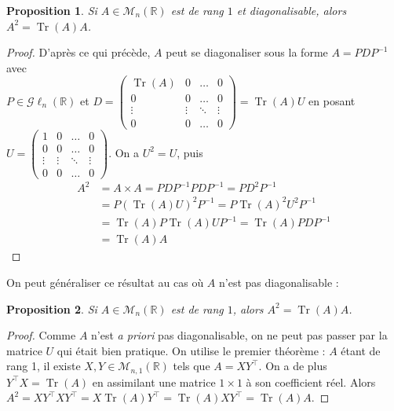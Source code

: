 \documentclass[a4paper]{article}
\newtheorem*{proposition}{Proposition}
\begin{document}
\begin{proposition}
    Si $A \in \mathcal{M}_{n}(\mathbb{R})$ est de rang $1$ et diagonalisable, alors $A^2 = \operatorname{Tr}(A)A$.
\end{proposition}

\begin{proof}
    D'après ce qui précède, $A$ peut se diagonaliser sous la forme $A = PDP^{-1}$ avec\\ $P \in \mathcal{G}\ell_n(\mathbb{R})$ et $D = \begin{pmatrix} \operatorname{Tr}(A) & 0 & \dots & 0 \\ 0 & 0 & \dots & 0 \\ \vdots & \vdots & \ddots & \vdots \\ 0 & 0 & \dots & 0\end{pmatrix} = \operatorname{Tr}(A) U$ en posant $U = \begin{pmatrix} 1 & 0 & \dots & 0 \\ 0 & 0 & \dots & 0 \\ \vdots & \vdots & \ddots & \vdots \\ 0 & 0 & \dots & 0\end{pmatrix}$. On a $U^2 = U$, puis 
    \begin{align*}
        A^2 &= A \times A = PDP^{-1}PDP^{-1} = PD^2P^{-1} \\
        &= P\left(\operatorname{Tr}(A)U\right)^2P^{-1} = P\operatorname{Tr}(A)^2U^2P^{-1} \\
        &= \operatorname{Tr}(A)P\operatorname{Tr}(A)UP^{-1} =  \operatorname{Tr}(A)PDP^{-1} \\
        &= \operatorname{Tr}(A)A
    \end{align*}
\end{proof}

On peut généraliser ce résultat au cas où $A$ n'est pas diagonalisable :

\begin{proposition}
    Si $A \in \mathcal{M}_{n}(\mathbb{R})$ est de rang $1$, alors $A^2 = \operatorname{Tr}(A)A$.
\end{proposition}

\begin{proof}
    Comme $A$ n'est \emph{a priori} pas diagonalisable, on ne peut pas passer par la matrice $U$ qui était bien pratique. On utilise le premier théorème : $A$ étant de rang 1, il existe $X, Y \in \mathcal{M}_{n, 1}(\mathbb{R})$ tels que $A = XY^\top$. On a de plus $Y^\top X = \operatorname{Tr}(A)$ en assimilant une matrice $1\times1$ à son coefficient réel. Alors $A^2 = XY^\top XY^\top = X\operatorname{Tr}(A)Y^\top = \operatorname{Tr}(A)XY^\top = \operatorname{Tr}(A)A$.
\end{proof}
\end{document}
